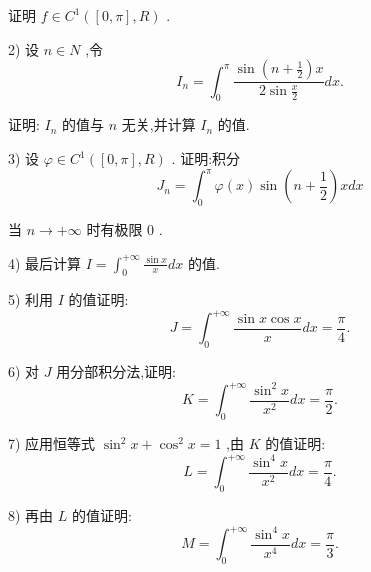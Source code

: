 证明 $f \in  {C}^{1}\left( {\left\lbrack  {0,\pi }\right\rbrack  ,R}\right)$ .

2) 设 $n \in  N$ ,令
$${I}_{n} = {\int }_{0}^{\pi }\frac{\sin \left( {n + \frac{1}{2}}\right) x}{2\sin \frac{x}{2}}{dx}.$$

证明: ${I}_{n}$ 的值与 $n$ 无关,并计算 ${I}_{n}$ 的值.

3) 设 $\varphi  \in  {C}^{1}\left( {\left\lbrack  {0,\pi }\right\rbrack  ,R}\right)$ . 证明:积分
$${J}_{n} = {\int }_{0}^{\pi }\varphi \left( x\right) \sin \left( {n + \frac{1}{2}}\right) {xdx}$$

当 $n \rightarrow   + \infty$ 时有极限 0 .

4) 最后计算 $I = {\int }_{0}^{+\infty }\frac{\sin x}{x}{dx}$ 的值.

5) 利用 $I$ 的值证明:
$$J = {\int }_{0}^{+\infty }\frac{\sin x\cos x}{x}{dx} = \frac{\pi }{4}.$$

6) 对 $J$ 用分部积分法,证明:
$$K = {\int }_{0}^{+\infty }\frac{{\sin }^{2}x}{{x}^{2}}{dx} = \frac{\pi }{2}.$$

7) 应用恒等式 ${\sin }^{2}x + {\cos }^{2}x = 1$ ,由 $K$ 的值证明:
$$L = {\int }_{0}^{+\infty }\frac{{\sin }^{4}x}{{x}^{2}}{dx} = \frac{\pi }{4}.$$

8) 再由 $L$ 的值证明:
$$M = {\int }_{0}^{+\infty }\frac{{\sin }^{4}x}{{x}^{4}}{dx} = \frac{\pi }{3}.$$


